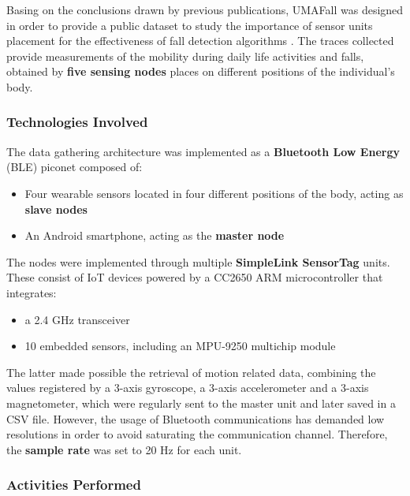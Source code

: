 Basing on the conclusions drawn by previous publications, UMAFall was designed in order to provide a public dataset to study the importance of sensor units placement for the effectiveness of fall detection algorithms \cite{umafall}. The traces collected provide measurements of the mobility during daily life activities and falls, obtained by \textbf{five sensing nodes} places on different positions of the individual's body.

\subsubsection{Technologies Involved}\label{subsubsec:umafall-technologies}

The data gathering architecture was implemented as a \textbf{Bluetooth Low Energy} (BLE) piconet composed of:

\begin{itemize}
    \item Four wearable sensors located in four different positions of the body, acting as \textbf{slave nodes}
    \item An Android smartphone, acting as the \textbf{master node}
\end{itemize}

The nodes were implemented through multiple \textbf{SimpleLink SensorTag} units. These consist of IoT devices powered by a CC2650 ARM microcontroller that integrates: 

\begin{itemize}
    \item a 2.4 GHz transceiver
    \item 10 embedded sensors, including an MPU-9250 multichip module
\end{itemize}

The latter made possible the retrieval of motion related data, combining the values registered by a 3-axis gyroscope, a 3-axis accelerometer and a 3-axis magnetometer, which were regularly sent to the master unit and later saved in a CSV file. However, the usage of Bluetooth communications has demanded low resolutions in order to avoid saturating the communication channel. Therefore, the \textbf{sample rate} was set to 20 Hz for each unit.

\subsubsection{Activities Performed}\label{subsubsec:umafall-activities}

